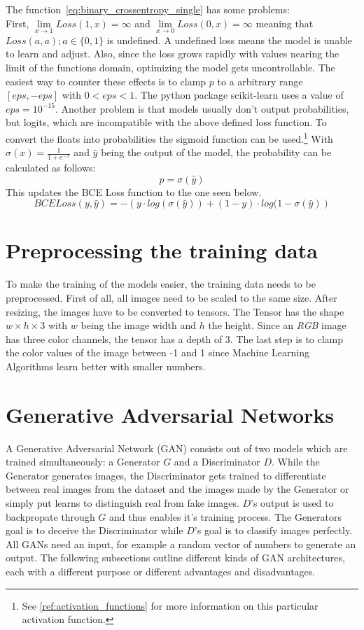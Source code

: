 \documentclass{article}
\begin{document}
The function~\ref{eq:binary_crossentropy_single} has some problems:\\
First, $\lim \limits_{x \to 1} Loss(1, x) = \infty$ and $\lim \limits_{x \to 0} Loss(0, x) = \infty$ meaning that $Loss(a, a); a\in \{0,1\}$ is undefined. A undefined loss means the model is unable to learn and adjust. Also, since the loss grows rapidly with values nearing the limit of the functions domain, optimizing the model gets uncontrollable. The easiest way to counter these effects is to clamp $p$ to a arbitrary range $[eps, -eps]$ with $0 < eps < 1$. The python package scikit-learn uses a value of $eps = 10^{-15}$.
Another problem is that models usually don't output probabilities, but logits, which are incompatible with the above defined loss function. To convert the floats into probabilities the sigmoid function can be used.\footnote{See \ref{ref:activation_functions} for more information on this particular activation function.} With $\sigma(x)=\frac{1}{1+e^{-x}}$ and $\hat{y}$ being the output of the model, the probability can be calculated as follows:
\begin{equation}
    p = \sigma(\hat{y})
\end{equation}
This updates the BCE Loss function to the one seen below.
\begin{equation}
    BCELoss(y, \hat{y}) = -\left(y \cdot log(\sigma(\hat{y}))+(1-y)\cdot log(1-\sigma(\hat{y})\right)
\end{equation}

\section{Preprocessing the training data}
To make the training of the models easier, the training data needs to be preprocessed. First of all, all images need to be scaled to the same size.
After resizing, the images have to be converted to tensors. The Tensor has the shape $w\times h\times 3$ with $w$ being the image width and $h$ the height. Since an \textit{RGB} image has three color channels, the tensor has a depth of 3. 
The last step is to clamp the color values of the image between -1 and 1 since Machine Learning Algorithms learn better with smaller numbers.


\section{Generative Adversarial Networks}
A Generative Adversarial Network (GAN) consists out of two models which are trained simultaneously: a Generator $G$ and a Discriminator $D$. While the Generator generates images, the Discriminator gets trained to differentiate between real images from the dataset and the images made by the Generator or simply put learns to distinguish real from fake images. $D$'s output is used to backpropate through $G$ and thus enables it's training process. The Generators goal is to deceive the Discriminator while $D$'s goal is to classify images perfectly.\\
All GANs need an input, for example a random vector of numbers to generate an output. The following subsections outline different kinds of GAN architectures, each with a different purpose or different advantages and disadvantages.
\end{document}
